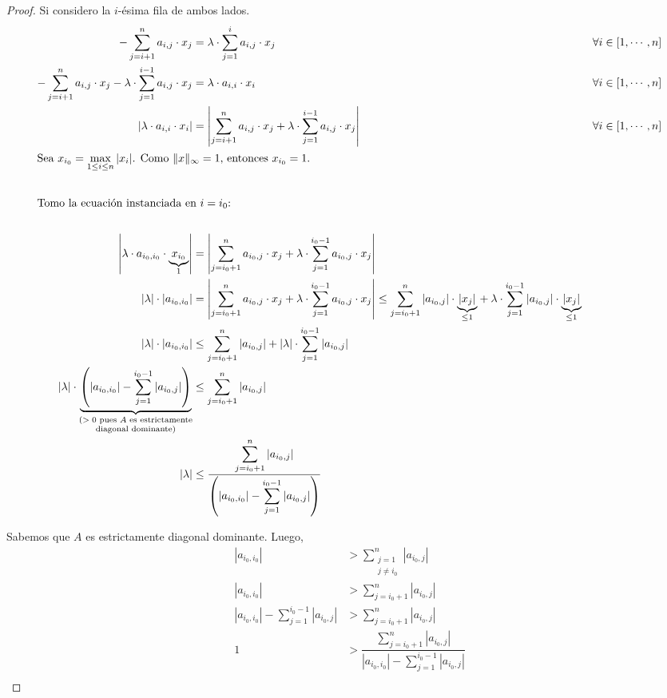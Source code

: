\documentclass[]{article}
\begin{document}
\begin{prop}
\begin{proof}
		Si considero la $i$-ésima fila de ambos lados.
		\begin{align*}
			-\sum_{j=i+1}^{n}{a_{i,j}\cdot x_j} &= \lambda \cdot \sum_{j=1}^{i}{a_{i,j}\cdot x_j} & \forall i \in [1,\cdots,n]\\
			-\sum_{j=i+1}^{n}{a_{i,j}\cdot x_j} - \lambda \cdot \sum_{j=1}^{i-1}{a_{i,j}\cdot x_j} &= \lambda\cdot a_{i,i}\cdot x_i & \forall i \in [1,\cdots,n]\\
			\left|\lambda\cdot a_{i,i}\cdot x_i\right| &= \left| \sum_{j=i+1}^n{a_{i,j}\cdot x_j} + \lambda \cdot \sum_{j=1}^{i-1}{a_{i,j}\cdot x_j}\right| & \forall i \in [1,\cdots,n]\\
			\intertext{Sea $x_{i_0} = \displaystyle \max_{1\leq i \leq n} |x_i|$. Como $\|x\|_\infty=1$, entonces $x_{i_0} = 1$.}\\
			\intertext{Tomo la ecuación instanciada en $i=i_0$:}\\
			\left|\lambda\cdot a_{i_0,i_0}\cdot \underbrace{x_{i_0}}_{1}\right| &= \left| \sum_{j=i_0+1}^n{a_{i_0,j}\cdot x_j} + \lambda \cdot \sum_{j=1}^{i_0-1}{a_{i_0,j}\cdot x_j}\right|\\
			|\lambda|\cdot|a_{i_0,i_0}| &= \left| \sum_{j=i_0+1}^n{a_{i_0,j}\cdot x_j} + \lambda \cdot \sum_{j=1}^{i_0-1}{a_{i_0,j}\cdot x_j}\right| \leq \sum_{j=i_0+1}^n{|a_{i_0,j}|\cdot \underbrace{|x_j|}_{\leq 1}} + \lambda \cdot \sum_{j=1}^{i_0-1}{|a_{i_0,j}|\cdot \underbrace{|x_j|}_{\leq 1}}\\ %
			|\lambda|\cdot|a_{i_0,i_0}| &\leq \sum_{j=i_0+1}^n{|a_{i_0,j}|} + |\lambda|\cdot\sum_{j=1}^{i_0-1} |a_{i_0,j}|\\
			|\lambda|\cdot\underbrace{\left(|a_{i_0,i_0}| - \sum_{j=1}^{i_0-1}{|a_{i_0,j}|}\right)}_{\substack{\text{($>0$ pues $A$ es estrictamente}\\ \text{diagonal dominante)}}} &\leq \sum_{j=i_0+1}^n{|a_{i_0,j}|}\\
			|\lambda| &\leq \dfrac{\displaystyle \sum_{j=i_0+1}^n{|a_{i_0,j}|}}{\displaystyle \left(|a_{i_0,i_0}| - \sum_{j=1}^{i_0-1}{|a_{i_0,j}|}\right)}\\
		\end{align*}

		Sabemos que $A$ es estrictamente diagonal dominante. Luego,
		\begin{align*}
			|a_{i_0,i_0}| &> \sum_{\substack{j=1 \\ j\neq i_0}}^n |a_{i_0,j}|\\
			|a_{i_0,i_0}| &> \sum_{j=i_0+1}^{n} |a_{i_0,j}|\\
			|a_{i_0,i_0}| - \sum_{j=1}^{i_0-1} |a_{i_0,j}| & > \sum_{j=i_0+1}^{n} |a_{i_0,j}|\\
			1 &> \dfrac{\displaystyle \sum_{j=i_0+1}^{n} |a_{i_0,j}|}{\displaystyle |a_{i_0,i_0}| - \sum_{j=1}^{i_0-1} |a_{i_0,j}|}\\
		\end{align*}


\end{proof}
\end{prop}
\end{document}
